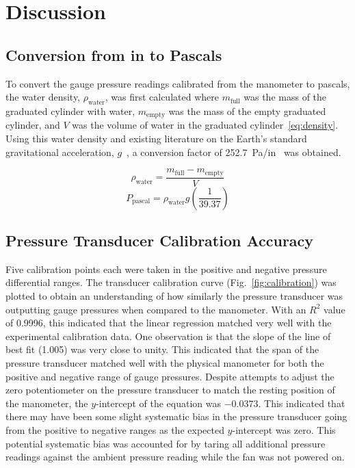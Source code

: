\documentclass[journal,letterpaper]{IEEEtran}
\begin{document}
\section{Discussion}

\subsection{Conversion from in to Pascals}

To convert the gauge pressure readings calibrated from the manometer to pascals, the water density, $\rho_\text{water}$, was first calculated where $m_\text{full}$ was the mass of the graduated cylinder with water, $m_\text{empty}$ was the mass of the empty graduated cylinder, and $V$ was the volume of water in the graduated cylinder~\eqref{eq:density}.
Using this water density and existing literature on the Earth's standard gravitational acceleration, $g$~\cite{gravity}, a conversion factor of \qty{252.7}{Pa/in} was obtained.

\begin{equation} \label{eq:density}
    \rho_\text{water} = \frac{m_\text{full} - m_\text{empty}}{V}
\end{equation}
\begin{equation} \label{eq:convFactor}
    P_\text{pascal} = \rho_\text{water}g\left(\frac{1}{39.37}\right)
\end{equation}

\subsection{Pressure Transducer Calibration Accuracy}

Five calibration points each were taken in the positive and negative pressure differential ranges.
The transducer calibration curve (Fig.~\ref{fig:calibration}) was plotted to obtain an understanding of how similarly the pressure transducer was outputting gauge pressures when compared to the manometer.
With an $R^2$ value of 0.9996, this indicated that the linear regression matched very well with the experimental calibration data.
One observation is that the slope of the line of best fit (1.005) was very close to unity.
This indicated that the span of the pressure transducer matched well with the physical manometer for both the positive and negative range of gauge pressures.
Despite attempts to adjust the zero potentiometer on the pressure transducer to match the resting position of the manometer, the $y$-intercept of the equation was $-0.0373$.
This indicated that there may have been some slight systematic bias in the pressure transducer going from the positive to negative ranges as the expected $y$-intercept was zero.
This potential systematic bias was accounted for by taring all additional pressure readings against the ambient pressure reading while the fan was not powered on.
\end{document}
